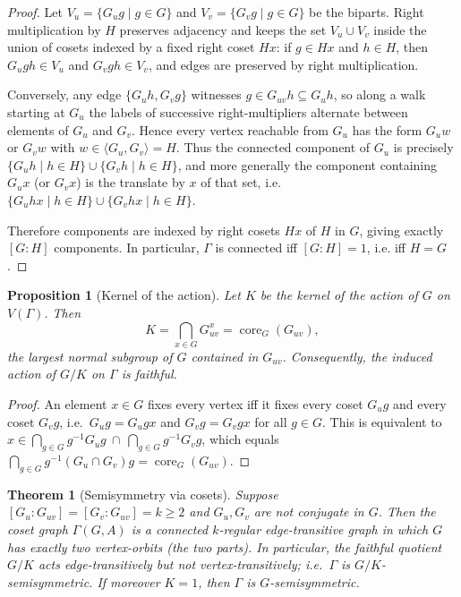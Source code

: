 \documentclass[12pt,a4paper,openany]{book}
\newtheorem{theorem}{Theorem}[section]
\newtheorem{proposition}{Proposition}[section]
\begin{document}
\begin{proof}
Let $V_u=\{G_u g\mid g\in G\}$ and $V_v=\{G_v g\mid g\in G\}$ be the biparts.
Right multiplication by $H$ preserves adjacency and keeps the set
$V_u\cup V_v$ inside the union of cosets indexed by a fixed right coset $Hx$:
if $g\in Hx$ and $h\in H$, then $G_u g h\in V_u$ and $G_v g h\in V_v$, and edges
are preserved by right multiplication.

Conversely, any edge $\{G_u h, G_v g\}$ witnesses $g\in G_{uv}h\subseteq G_u h$,
so along a walk starting at $G_u$ the labels of successive right-multipliers
alternate between elements of $G_u$ and $G_v$. Hence every vertex reachable
from $G_u$ has the form $G_u w$ or $G_v w$ with $w\in\langle G_u,G_v\rangle=H$.
Thus the connected component of $G_u$ is precisely
$\{G_u h\mid h\in H\}\cup\{G_v h\mid h\in H\}$, and more generally the component
containing $G_u x$ (or $G_v x$) is the translate by $x$ of that set, i.e.
$\{G_u hx\mid h\in H\}\cup\{G_v hx\mid h\in H\}$.

Therefore components are indexed by right cosets $Hx$ of $H$ in $G$, giving
exactly $[G:H]$ components. In particular, $\Gamma$ is connected iff $[G:H]=1$,
i.e. iff $H=G$.
\end{proof}


\begin{proposition}[Kernel of the action]
Let $K$ be the kernel of the action of $G$ on $V(\Gamma)$. Then
\[
K=\bigcap_{x\in G} G_{uv}^x=\operatorname{core}_G(G_{uv}),
\]
the largest normal subgroup of $G$ contained in $G_{uv}$. Consequently, the induced
action of $G/K$ on $\Gamma$ is faithful.
\end{proposition}

\begin{proof}
An element $x\in G$ fixes every vertex iff it fixes every coset $G_u g$ and every
coset $G_v g$, i.e.\ $G_u g=G_u gx$ and $G_v g=G_v gx$ for all $g\in G$.
This is equivalent to $x\in \bigcap_{g\in G} g^{-1}G_u g \ \cap\ \bigcap_{g\in G} g^{-1}G_v g$,
which equals $\bigcap_{g\in G} g^{-1}(G_u\cap G_v) g = \operatorname{core}_G(G_{uv})$.
\end{proof}

\begin{theorem}[Semisymmetry via cosets]\label{thm:coset-semisym}
Suppose $[G_u:G_{uv}]=[G_v:G_{uv}]=k\ge2$ and $G_u,G_v$ are not conjugate in $G$.
Then the coset graph $\Gamma(G,A)$ is a connected $k$-regular edge-transitive graph
in which $G$ has exactly two vertex-orbits (the two parts). In particular, the faithful
quotient $G/K$ acts edge-transitively but not vertex-transitively; i.e.\ $\Gamma$ is
$G/K$-semisymmetric. If moreover $K=1$, then $\Gamma$ is $G$-semisymmetric.
\end{theorem}
\end{document}
